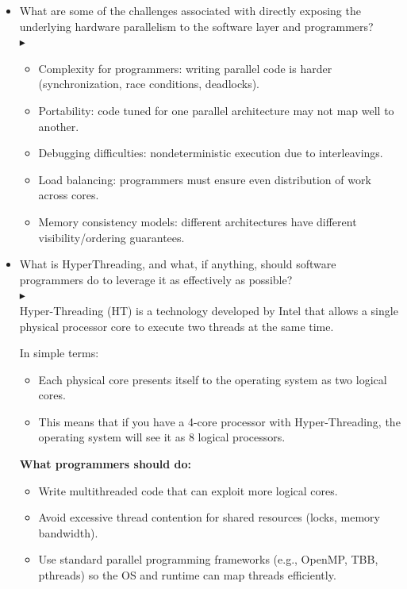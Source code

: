 \documentclass[12pt]{article}
\begin{document}
\begin{itemize}[left = 0pt]
    \item What are some of the challenges associated with directly exposing the underlying hardware parallelism to the software layer and programmers?\\
    $\blacktriangleright$
    \begin{itemize}
        \item Complexity for programmers: writing parallel code is harder (synchronization, race conditions, deadlocks).
        \item Portability: code tuned for one parallel architecture may not map well to another.
        \item Debugging difficulties: nondeterministic execution due to interleavings.
        \item Load balancing: programmers must ensure even distribution of work across cores.
        \item Memory consistency models: different architectures have different visibility/ordering guarantees.
    \end{itemize}

    \item What is HyperThreading, and what, if anything, should software programmers do to leverage it as effectively as possible?\\
    $\blacktriangleright$\\
    Hyper-Threading (HT) is a technology developed by Intel that allows a single physical processor core to execute two threads at the same time.
    
    In simple terms:
    \begin{itemize}
        \item Each physical core presents itself to the operating system as two logical cores.
        \item This means that if you have a 4-core processor with Hyper-Threading, the operating system will see it as 8 logical processors.
    \end{itemize}

    \textbf{What programmers should do:}
    \begin{itemize}
        \item Write multithreaded code that can exploit more logical cores.
        \item Avoid excessive thread contention for shared resources (locks, memory bandwidth).
        \item Use standard parallel programming frameworks (e.g., OpenMP, TBB, pthreads) so the OS and runtime can map threads efficiently.
    \end{itemize}
\end{itemize}
\end{document}
